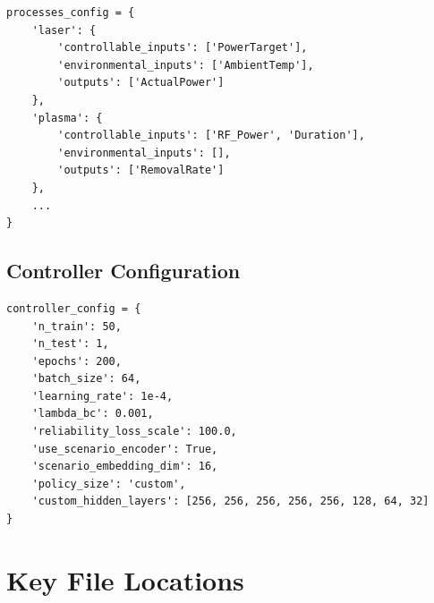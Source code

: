 \documentclass[11pt,a4paper]{article}
\begin{document}
\begin{verbatim}
processes_config = {
    'laser': {
        'controllable_inputs': ['PowerTarget'],
        'environmental_inputs': ['AmbientTemp'],
        'outputs': ['ActualPower']
    },
    'plasma': {
        'controllable_inputs': ['RF_Power', 'Duration'],
        'environmental_inputs': [],
        'outputs': ['RemovalRate']
    },
    ...
}
\end{verbatim}

\subsection{Controller Configuration}

\begin{verbatim}
controller_config = {
    'n_train': 50,
    'n_test': 1,
    'epochs': 200,
    'batch_size': 64,
    'learning_rate': 1e-4,
    'lambda_bc': 0.001,
    'reliability_loss_scale': 100.0,
    'use_scenario_encoder': True,
    'scenario_embedding_dim': 16,
    'policy_size': 'custom',
    'custom_hidden_layers': [256, 256, 256, 256, 256, 128, 64, 32]
}
\end{verbatim}

\section{Key File Locations}
\end{document}
